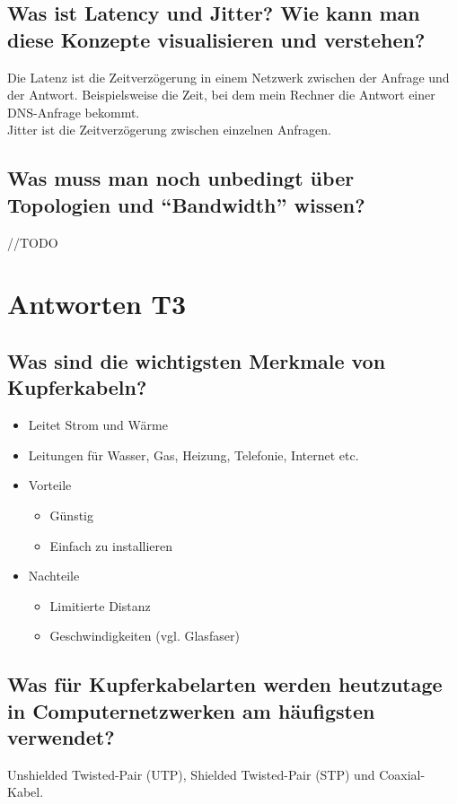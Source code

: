 \subsection*{Was ist \flqq{}Latency\frqq{} und \flqq{}Jitter\frqq? Wie kann man diese Konzepte visualisieren und verstehen?}
Die Latenz ist die Zeitverzögerung in einem Netzwerk zwischen der Anfrage und der Antwort. Beispielsweise die Zeit, bei dem mein Rechner die Antwort einer DNS-Anfrage bekommt.\\
Jitter ist die Zeitverzögerung zwischen einzelnen Anfragen.

\subsection*{Was muss man noch unbedingt über Topologien und "`Bandwidth"' wissen?}
//TODO

\section{Antworten T3}
\subsection*{Was sind die wichtigsten Merkmale von Kupferkabeln?}
\begin{itemize}
    \item Leitet Strom und Wärme
    \item Leitungen für Wasser, Gas, Heizung, Telefonie, Internet etc.
    \item Vorteile
    \begin{itemize}
        \item Günstig
        \item Einfach zu installieren
    \end{itemize}
    \item Nachteile
    \begin{itemize}
        \item Limitierte Distanz
        \item Geschwindigkeiten (vgl. Glasfaser)
    \end{itemize}
\end{itemize}

\subsection*{Was für Kupferkabelarten werden heutzutage in Computernetzwerken am häufigsten verwendet?}
Unshielded Twisted-Pair (UTP), Shielded Twisted-Pair (STP) und Coaxial-Kabel.

